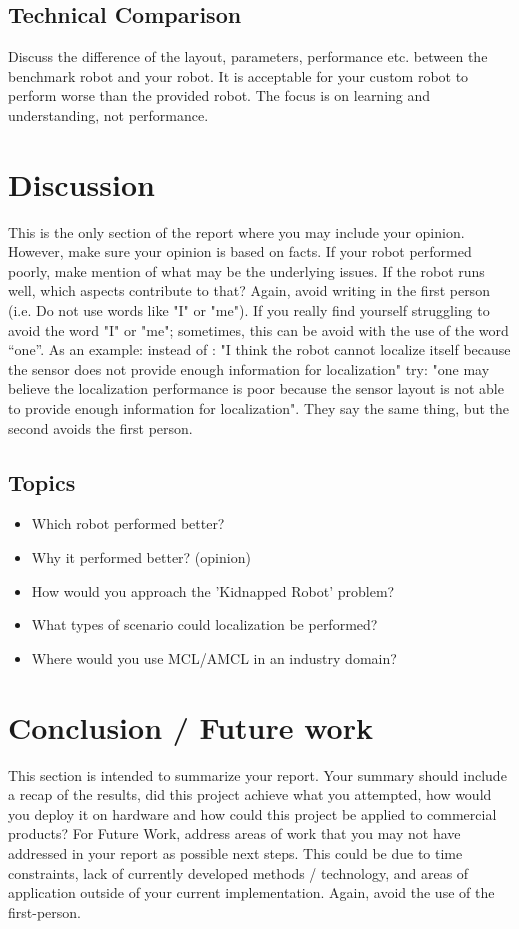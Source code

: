 \documentclass[10pt,journal,compsoc]{IEEEtran}
\begin{document}
\subsection{Technical Comparison} %
Discuss the difference of the layout, parameters, performance etc. between the benchmark robot and your robot. It is acceptable for your custom robot to perform worse than the provided robot. The focus is on learning and understanding, not performance.

\section{Discussion}
This is the only section of the report where you may include your opinion. However, make sure your opinion is based on facts. If your robot performed poorly, make mention of what may be the underlying issues. If the robot runs well, which aspects contribute to that? Again, avoid writing in the first person (i.e. Do not use words like "I" or "me"). If you really find yourself struggling to avoid the word "I" or "me"; sometimes, this can be avoid with the use of the word “one”. As an example: instead of : "I think the robot cannot localize itself because the sensor does not provide enough information for localization" try: "one may believe the localization performance is poor because the sensor layout is not able to provide enough information for localization". They say the same thing, but the second avoids the first person.

\subsection{Topics}
\begin{itemize}
\item Which robot performed better?
\item Why it performed better? (opinion)
\item How would you approach the 'Kidnapped Robot' problem?
\item What types of scenario could localization be performed?
\item Where would you use MCL/AMCL in an industry domain?
\end {itemize}

\section{Conclusion / Future work}
This section is intended to summarize your report. Your summary should include a recap of the results, did this project achieve what you attempted, how would you deploy it on hardware and how could this project be applied to commercial products?
For Future Work, address areas of work that you may not have addressed in your report as possible next steps. This could be due to time constraints, lack of currently developed methods / technology, and areas of application outside of your current implementation. Again, avoid the use of the first-person.
\end{document}
